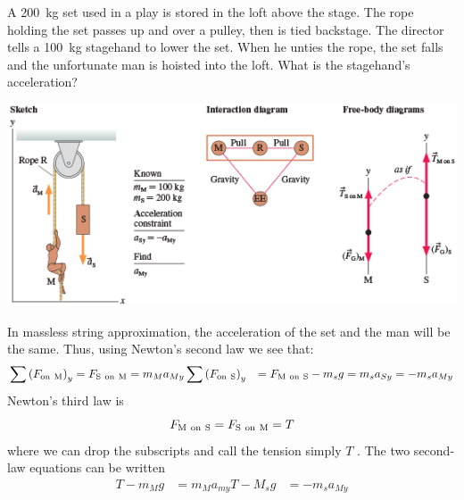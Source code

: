 \begin{Exercise}[title={The show must go on!}, origin={Knight}]
    A \SI{200}{\kilogram} set used in a play is stored in the loft above
    the stage.  The rope holding the set passes up and over a pulley,
    then is tied backstage.  The director tells a \SI{100}{\kilogram}
    stagehand to lower the set.  When he unties the rope, the set falls
    and the unfortunate man is hoisted into the loft.  What is the
    stagehand's acceleration?
\end{Exercise}
\begin{Answer}
    \begin{center}
        \includegraphics[totalheight=0.2\textheight]{../figures/stagehand-pictorial.png}
        \label{fig:stagehand-model}
    \end{center}

    In massless string approximation, the acceleration of the set and
    the man will be the same.  Thus, using Newton's second law we see
    that:
    \begin{align}
        \sum \left(F_{\mathrm{on~M}}\right)_y &= F_{\mathrm{S~on~M}} = m_M
        a_{My} \sum \left(F_{\mathrm{on~S}}\right)_y &= F_{\mathrm{M~on~S}}
        - m_sg = m_s a_ {Sy} = -m_s a_{My}
    \end{align}
    Newton's third law is
    \begin{equation}
        F_{\mathrm{M~on~S}}=F_{\mathrm{S~on~M}}=T
    \end{equation}
    where we can drop the subscripts and call the tension simply
    $
        T
    $%
.    The two second-law equations can be written
    \begin{align}
        T-m_Mg &= m_Ma_{my} T-M_sg &= -m_sa_{My}
    \end{align}
\end{Answer}
